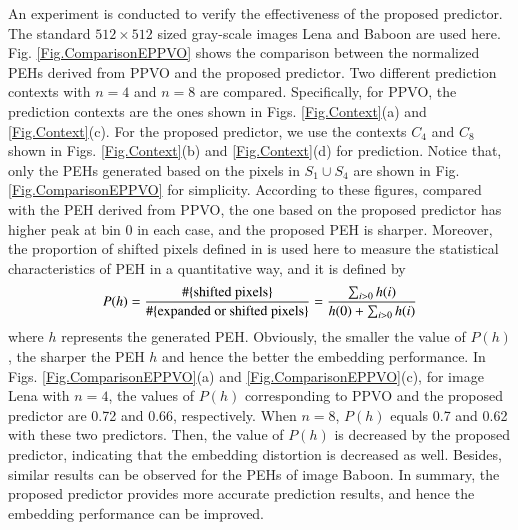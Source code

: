 \documentclass[review,3p,10pt,sort&compress]{elsarticle}
\begin{document}
An experiment is conducted to verify the effectiveness of the proposed predictor. The standard $512 \times 512$ sized gray-scale images Lena and Baboon are used here. Fig. \ref{Fig.ComparisonEPPVO} shows the comparison between the normalized PEHs derived from PPVO and the proposed predictor. Two different prediction contexts with $n = 4$ and $n = 8$ are compared. Specifically, for PPVO, the prediction contexts are the ones shown in Figs. \ref{Fig.Context}(a) and \ref{Fig.Context}(c). For the proposed predictor, we use the contexts $C_4$ and $C_8$ shown in Figs. \ref{Fig.Context}(b) and \ref{Fig.Context}(d) for prediction. Notice that, only the PEHs generated based on the pixels in $S_1 \cup S_4$ are shown in Fig. \ref{Fig.ComparisonEPPVO} for simplicity.
According to these figures, compared with the PEH derived from PPVO, the one based on the proposed predictor has higher peak at bin 0 in each case, and the proposed PEH is sharper.
Moreover, the proportion of shifted pixels defined in \cite{Li2013PVO} is used here to measure the statistical characteristics of PEH in a quantitative way, and it is defined by
\begin{equation}\label{eq:Pshift}
    P(h)=\frac{\#\{{\rm shifted\ pixels}\}}{\#\{{\rm expanded\ or\ shifted\ pixels}\}} = \frac{\sum_{i > 0}h(i)}{h(0) + \sum_{i > 0}h(i)}
\end{equation}
where $h$ represents the generated PEH. Obviously, the smaller the value of $P(h)$, the sharper the PEH $h$ and hence the better the embedding performance. In Figs. \ref{Fig.ComparisonEPPVO}(a) and \ref{Fig.ComparisonEPPVO}(c), for image Lena with $n=4$, the values of $P(h)$ corresponding to PPVO and the proposed predictor are 0.72 and 0.66, respectively. When $n=8$, $P(h)$ equals 0.7 and 0.62 with these two predictors. Then, the value of $P(h)$ is decreased by the proposed predictor, indicating that the embedding distortion is decreased as well. Besides, similar results can be observed for the PEHs of image Baboon. In summary, the proposed predictor provides more accurate prediction results, and hence the embedding performance can be improved.
\end{document}
